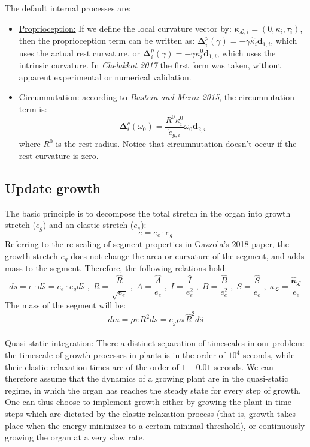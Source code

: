 \documentclass[a4paper, 11pt]{article}
\begin{document}
The default internal processes are:
\begin{itemize}
    \item \underline{Proprioception:} If we define the local curvature vector by: $\boldsymbol{\kappa}_{\mathcal{L},i}=(0,\kappa_i,\tau_i)$, then the proprioception term can be written as: $\boldsymbol{\Delta}^p_i(\gamma)=-\gamma\hat{\kappa}_i\boldsymbol{d}_{1,i}$, which uses the actual rest curvature, or $\boldsymbol{\Delta}^p_i(\gamma)=-\gamma\kappa^0_i\boldsymbol{d}_{1,i}$, which uses the intrinsic curvature. In \emph{Chelakkot 2017} the first form was taken, without apparent experimental or numerical validation.
    
    \item \underline{Circumnutation:} according to \emph{Bastein and Meroz 2015}, the circumnutation term is:
    \begin{equation}
    \boldsymbol{\Delta}^{c}_i(\omega_0)=\frac{R^0\kappa^0_i}{\dot{e}_{g,i}}\omega_0\boldsymbol{d}_{2,i}    
    \end{equation}
    where $R^0$ is the rest radius. Notice that circumnutation doesn't occur if the rest curvature is zero.
\end{itemize}

\subsection*{Update growth}
The basic principle is to decompose the total stretch in the organ into growth stretch ($e_g$) and an elastic stretch ($e_e$):
\begin{equation}
    e=e_e\cdot e_g
\end{equation}
Referring to the re-scaling of segment properties in Gazzola's 2018 paper, the growth stretch $e_g$ does not change the area or curvature of the segment, and adds mass to the segment. Therefore, the following relations hold:
\begin{equation}
    ds=e\cdot d\hat{s}=e_e\cdot e_gd\hat{s}\;,\;
    R=\frac{\hat{R}}{\sqrt{e_e}}\;,\;
    A=\frac{\hat{A}}{e_e}\;,\;
    I=\frac{\hat{I}}{e_e^2}\;,\;
    B=\frac{\hat{B}}{e_e^2}\;,\;
    S=\frac{\hat{S}}{e_e}\;,\;
    \kappa_{\mathcal{L}}=\frac{\hat{\boldsymbol{\kappa}}_{\mathcal{L}}}{e_e}
\end{equation}
The mass of the segment will be:
\begin{equation}
    dm=\rho \pi R^2 ds=e_g\rho\pi\hat{R}^2 d\hat{s}
\end{equation}
\\
\noindent \underline{Quasi-static integration:} There a distinct separation of timescales in our problem: the timescale of growth processes in plants is in the order of $10^4$ seconds, while their elastic relaxation times are of the order of $1-0.01$ seconds. We can therefore assume that the dynamics of a growing plant are in the quasi-static regime, in which the organ has reaches the steady state for every step of growth. One can thus choose to implement growth either by growing the plant in time-steps which are dictated by the elastic relaxation process (that is, growth takes place when the energy minimizes to a certain minimal threshold), or continuously growing the organ at a very slow rate. \\
\end{document}
